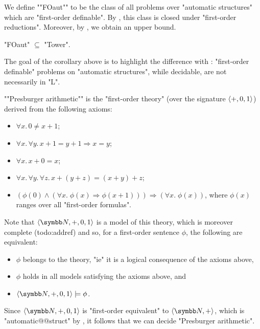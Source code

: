 We define \AP""FOaut"" to be the class of all problems over "automatic structures"
which are "first-order definable". By ,
this class is closed under "first-order reductions". Moreover,
by , we obtain an upper bound.

\begin{corollary}
	"FOaut" $\subseteq$ "Tower".
\end{corollary}

The goal of the corollary above is to highlight the difference with :
"first-order definable" problems on "automatic structures", while decidable, are not necessarily
in "L".

\begin{remark}
	\AP""Presburger arithmetic"" is the "first-order theory" (over the signature $\langle+, 0, 1\rangle$)
	derived from the following axioms:
	\begin{itemize}
		\item $\forall x.\, 0 \neq x + 1$;
		\item $\forall x.\,\forall y.\, x + 1 = y + 1 \Rightarrow x = y$;
		\item $\forall x.\, x + 0 = x$;
		\item $\forall x.\,\forall y.\,\forall z.\, x + (y + z) = (x + y) + z$;
		\item $(\phi(0) \land (\forall x.\; \phi(x) \Rightarrow \phi(x+1))) \Rightarrow
			(\forall x.\; \phi(x))$, where $\phi(x)$ ranges over all "first-order formulas".
	\end{itemize}
	Note that $\tup{\N,+,0,1}$ is a model of this theory, which is moreover complete
	(todo:addref) and so, for a first-order sentence $\phi$, the following 
	are equivalent:
	\begin{itemize}
		\item $\phi$ belongs to the theory, "ie" it is a logical consequence of the axioms above,
		\item $\phi$ holds in all models satisfying the axioms above, and 
		\item $\tup{\N, +, 0, 1} \models \phi$.
	\end{itemize}
	Since $\tup{\N, +, 0, 1}$ is "first-order equivalent" to $\tup{\N, +}$, which
	is "automatic@@struct" by ,
	it follows that we can decide "Presburger arithmetic".
\end{remark}

